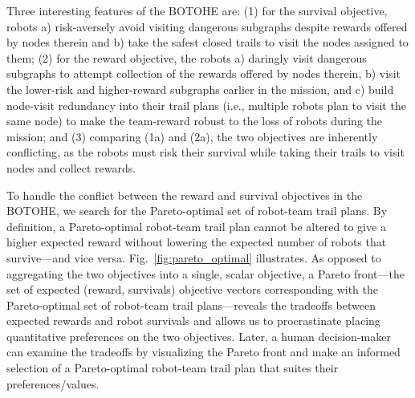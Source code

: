 \documentclass[fleqn,10pt,lineno]{wlpeerj}
\begin{document}
Three interesting features of the BOTOHE are: 
(1) for the survival objective, robots a) risk-aversely avoid visiting dangerous subgraphs despite rewards offered by nodes therein and b) take the safest closed trails to visit the nodes assigned to them;
(2) for the reward objective, the robots a) daringly visit dangerous subgraphs to attempt collection of the rewards offered by nodes therein, b) visit the lower-risk and higher-reward subgraphs earlier in the mission, and c) build node-visit redundancy into their trail plans (i.e., multiple robots plan to visit the same node) to make the team-reward robust to the loss of robots during the mission; and
(3) comparing (1a) and (2a), the two objectives are inherently conflicting, as the robots must risk their survival while taking their trails to visit nodes and collect rewards.%

To handle the conflict between the reward and survival objectives in the BOTOHE, we search for the Pareto-optimal set \cite{pardalos2017non,branke2008multiobjective} of robot-team trail plans. By definition, a Pareto-optimal robot-team trail plan cannot be altered to give a higher expected reward without lowering the expected number of robots that survive---and vice versa. 
Fig.~\ref{fig:pareto_optimal} illustrates.
As opposed to aggregating the two objectives into a single, scalar objective, a Pareto front---the set of expected (reward, survivals) objective vectors corresponding with the Pareto-optimal set of robot-team trail plans---reveals the tradeoffs between expected rewards and robot survivals and allows us to procrastinate placing quantitative preferences on the two objectives.
Later, a human decision-maker can examine the tradeoffs by visualizing the Pareto front and make an informed selection of a Pareto-optimal robot-team trail plan that suites their preferences/values.
\end{document}
